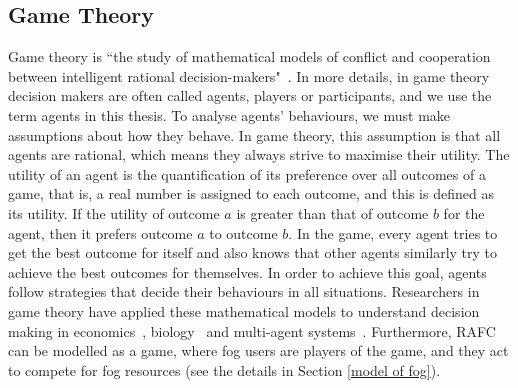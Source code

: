 \documentclass[11pt]{phdthesis}
\begin{document}
\subsection{Game Theory} \label{game theory}

Game theory is ``the study of mathematical models of conflict and cooperation between intelligent rational decision-makers"~\citep{roger1991game}. In more details, in game theory decision makers are often called agents, players or participants, and we use the term agents in this thesis. To analyse agents' behaviours, we must make assumptions about how they behave. In game theory, this assumption is that all agents are rational, which means they always strive to maximise their utility. The utility of an agent is the quantification of its preference over all outcomes of a game, that is, a real number is assigned to each outcome, and this is defined as its utility. If the utility of outcome $ a $ is greater than that of outcome $ b $ for the agent, then it prefers outcome $ a $ to outcome $ b $. In the game, every agent tries to get the best outcome for itself and also knows that other agents similarly try to achieve the best outcomes for themselves. In order to achieve this goal, agents follow strategies that decide their behaviours in all situations. Researchers in game theory have applied these mathematical models to understand decision making in economics~\citep{gu2005price,kelly2003decision}, biology~\citep{hammerstein1994game,dugatkin2000game} and multi-agent systems~\citep{parsons2002game,semsar2009multi}. Furthermore, RAFC can be modelled as a game, where fog users are players of the game, and they act to compete for fog resources (see the details in Section \ref{model of fog}).
\end{document}
